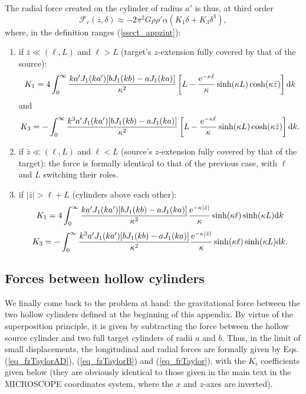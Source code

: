 \documentclass[12pt]{iopart}
\begin{document}
The radial force created on the cylinder of radius $a'$ is thus, at third order
\begin{equation} \label{eq_frTaylor}
{\mathcal F}_r(\bar{z}, \delta) \approx -2\pi^2 G \rho \rho' \alpha (K_1 \delta + K_3 \delta^3),
\end{equation}
where, in the definition ranges (\ref{ssect_appzint}):
\begin{enumerate}
\item if $\bar{z}\ll(\ell,L)$ and $\ell > L$ (target's $z$-extension fully covered by that of the source):
\begin{equation}
K_1 = 4 \int_0^\infty \frac{k a'J_1(ka') [bJ_1(kb) - aJ_1(ka)]}{\kappa^2} \left[ L - \frac{{\rm e}^{-\kappa \ell}}{\kappa} \sinh(\kappa L) \cosh(\kappa \bar{z})\right] {\rm d}k
\end{equation}
and
\begin{equation}
K_3 = -\int_0^\infty \frac{k^3 a'J_1(ka') [bJ_1(kb) - aJ_1(ka)]}{\kappa^2} \left[ L - \frac{{\rm e}^{-\kappa \ell}}{\kappa} \sinh(\kappa L) \cosh(\kappa \bar{z})\right] {\rm d}k.
\end{equation}

\item if $\bar{z}\ll(\ell,L)$ and $\ell < L$ (source's $z$-extension fully covered by that of the target): the force is formally identical to that of the previous case, with $\ell$ and $L$ switching their roles.

\item if $|\bar{z}| > \ell + L$ (cylinders above each other):
\begin{equation}
K_1 = 4 \int_0^\infty \frac{k a'J_1(ka') [bJ_1(kb) - aJ_1(ka)]}{\kappa^2} \frac{{\rm e}^{-\kappa |\bar{z}|}}{\kappa} \sinh(\kappa \ell) \sinh(\kappa L) {\rm d}k
\end{equation}
\begin{equation}
K_3 = -\int_0^\infty \frac{k^3 a'J_1(ka') [bJ_1(kb) - aJ_1(ka)]}{\kappa^2} \frac{{\rm e}^{-\kappa |\bar{z}|}}{\kappa} \sinh(\kappa \ell) \sinh(\kappa L) {\rm d}k.
\end{equation}

\end{enumerate}



\subsection{Forces between hollow cylinders}

We finally come back to the problem at hand: the gravitational force between the two hollow cylinders defined at the beginning of this appendix. By virtue of the superposition principle, it is given by subtracting the force between the hollow source cylinder and two full target cylinders of radii $a$ and $b$. Thus, in the limit of small displacements, the longitudinal and radial forces are formally given by Eqs. (\ref{eq_fzTaylorAD}), (\ref{eq_fzTaylorB}) and (\ref{eq_frTaylor}), with the $K_i$ coefficients given below (they are obviously identical to those given in the main text in the MICROSCOPE coordinates system, where the $x$ and $z$-axes are inverted).
\end{document}

